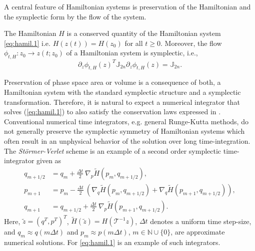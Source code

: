 
A central feature of Hamiltonian systems is preservation of the Hamiltonian and the symplectic form by the flow of the system.
\begin{theorem} \label{thm:1}
\cite{Marsden:2010:IMS:1965128} The Hamiltonian $H$ is a conserved quantity of the Hamiltonian system \eqref{eq:hamil.1} i.e. $H(z(t)) = H(z_0)$ for all $t \geq 0$. Moreover, the flow $\phi_{t,H}:z_0 \to z(t;z_0)$ of a Hamiltonian system is symplectic, i.e.,
$$\partial_z \phi_{t,H}(z)^T \mathbb J_{2n} \partial_z \phi_{t,H}(z) = \mathbb J_{2n}.$$
\end{theorem}

Preservation of phase space area or volume is a consequence of both, a Hamiltonian system with the standard symplectic structure and a symplectic transformation. Therefore, it is natural to expect a numerical integrator that solves (\ref{eq:hamil.1}) to also satisfy the conservation laws expressed in  . Conventional numerical time integrators, e.g. general Runge-Kutta methods, do not generally preserve the symplectic symmetry of Hamiltonian systems which often result in an unphysical behavior of the solution over long time-integration. The \emph{St\"ormer-Verlet} scheme is an example of a second order symplectic time-integrator given as
\begin{equation} \label{eq:hamil.6}
	\begin{aligned}
	q_{m+1/2} &= q_m + \frac{\Delta t} 2 ~ \nabla_p \tilde H(p_m,q_{m+1/2}), \\
	p_{m+1} &= p_m - \frac{\Delta t} 2  ~ \left( \nabla_q \tilde H(p_m,q_{m+1/2}) + \nabla_{q} \tilde H(p_{m+1},q_{m+1/2}) \right), \\
	q_{m+1} &= q_{m+1/2} + \frac{\Delta t} 2  ~  \nabla_p \tilde H(p_{m+1},q_{m+1/2}).
	\end{aligned}
\end{equation}
Here, $\tilde z = (q^T,p^T)^T$, $\tilde H(\tilde z) = H(\mathcal T^{-1}z)$, $\Delta t$ denotes a uniform time step-size, and $q_m \approx q(m\Delta t)$ and $p_m \approx p(m\Delta t)$, $m \in \mathbb{N} \cup \{ 0\}$, are approximate numerical solutions. For \cref{eq:hamil.1} is an example of such integrators.

